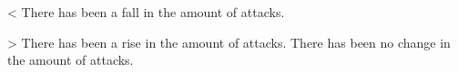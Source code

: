 \documentclass[a0paper,landscape]{baposter}
\begin{document}
\begin{poster}
{%
\ifnum \totalattackcurrentmonth<\totalattacksixmonth
{There has been a fall in the amount of attacks.}

\else
    \ifnum \totalattackcurrentmonth>\totalattacksixmonth
    {There has been a rise in the amount of attacks.}
    \else
    {There has been no change in the amount of attacks.}
    \fi
\fi






\vspace{5.1cm} %

}


\end{poster}
\end{document}
